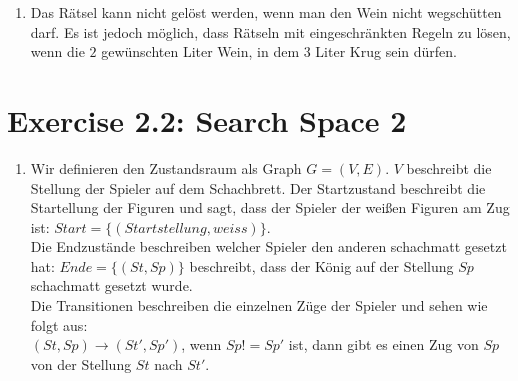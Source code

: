 \documentclass[a4paper]{scrartcl}
\def \blattnr {2}
\begin{document}
\begin{enumerate}
\begin{enumerate}[label=(\alph*)]
            \item
			Das Rätsel kann nicht gelöst werden, wenn man den Wein nicht wegschütten darf. Es ist jedoch 
			möglich, dass Rätseln mit eingeschränkten Regeln zu lösen, wenn die $2$  gewünschten Liter 
			Wein, in dem $3$ Liter Krug sein dürfen. \\

        \end{enumerate}

\end{enumerate}

\section*{Exercise \blattnr.2: Search Space 2}
\begin{enumerate}
	\item 
	Wir definieren den Zustandsraum als Graph $G = (V, E)$. $V$ beschreibt die Stellung der Spieler auf 
	dem Schachbrett. Der Startzustand beschreibt die Startellung der Figuren und sagt, dass der Spieler
	der weißen Figuren am Zug ist: $Start = \{(Startstellung, weiss)\}$. \\
	Die Endzustände beschreiben welcher Spieler den anderen schachmatt gesetzt hat: $Ende = \{(St, Sp)\}$ 
	beschreibt, dass der König auf der Stellung $Sp$ schachmatt gesetzt wurde. \\
	Die Transitionen beschreiben die einzelnen Züge der Spieler und sehen wie folgt aus: \\
	$(St, Sp) \rightarrow (St', Sp')$, wenn $Sp != Sp'$ ist, dann gibt es einen Zug von $Sp$ von der 
	Stellung $St$ nach $St'$. \\
	
\end{enumerate}
\end{document}
